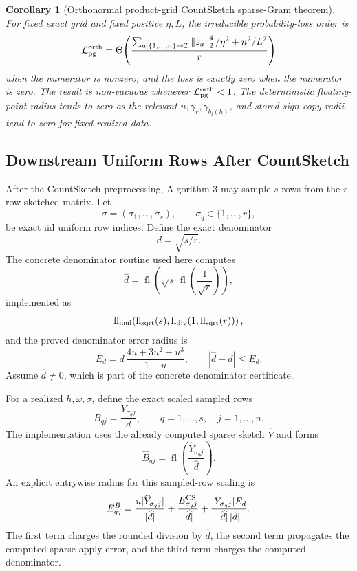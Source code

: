\documentclass[11pt]{article}
\newcommand{\Norm}[1]{\left\lVert #1\right\rVert_2}
\newcommand{\fl}{\operatorname{fl}}
\newtheorem{corollary}[theorem]{Corollary}
\theoremstyle{remark}
\begin{document}
\begin{corollary}[Orthonormal product-grid CountSketch sparse-Gram theorem]
For fixed exact grid and fixed positive \(\eta,L\), the irreducible
probability-loss order is
\[
  \mathcal L_{\rm pg}^{\rm orth}
  =
  \Theta\!\left(
    \frac{
      \sum_{a:\{1,\ldots,n\}\to\mathcal I}\Norm{z_a}^4/\eta^2
      +
      n^2/L^2
    }{r}
  \right)
\]
when the numerator is nonzero, and the loss is exactly zero when the numerator
is zero.  The result is non-vacuous whenever
\(\mathcal L_{\rm pg}^{\rm orth}<1\).  The deterministic floating-point radius
tends to zero as the relevant \(u,\gamma_r,\gamma_{b_i(h)}\), and stored-sign
copy radii tend to zero for fixed realized data.
\end{corollary}

\subsection*{Downstream Uniform Rows After CountSketch}

After the CountSketch preprocessing, Algorithm 3 may sample \(s\) rows from
the \(r\)-row sketched matrix.  Let
\[
  \sigma=(\sigma_1,\ldots,\sigma_s),
  \qquad
  \sigma_q\in\{1,\ldots,r\},
\]
be exact iid uniform row indices.  Define the exact denominator
\[
  d=\sqrt{s/r}.
\]
The concrete denominator routine used here computes
\[
  \widehat d
  =
  \fl\!\left(
    \sqrt{s}\,
    \fl\!\left(\frac{1}{\sqrt r}\right)
  \right),
\]
implemented as
\[
  \fl_{\rm mul}\!\left(
    \fl_{\rm sqrt}(s),
    \fl_{\rm div}\!\left(1,\fl_{\rm sqrt}(r)\right)
  \right),
\]
and the proved denominator error radius is
\[
  E_d
  =
  d\,\frac{4u+3u^2+u^3}{1-u},
  \qquad
  |\widehat d-d|\le E_d.
\]
Assume \(\widehat d\ne0\), which is part of the concrete denominator
certificate.

For a realized \(h,\omega,\sigma\), define the exact scaled sampled rows
\[
  B_{qj}
  =
  \frac{Y_{\sigma_q j}}{d},
  \qquad
  q=1,\ldots,s,\quad j=1,\ldots,n.
\]
The implementation uses the already computed sparse sketch \(\widehat Y\) and
forms
\[
  \widehat B_{qj}
  =
  \fl\!\left(\frac{\widehat Y_{\sigma_q j}}{\widehat d}\right).
\]
An explicit entrywise radius for this sampled-row scaling is
\[
  E^B_{qj}
  =
  \frac{u|\widehat Y_{\sigma_q j}|}{|\widehat d|}
  +
  \frac{E^{\rm CS}_{\sigma_q j}}{|\widehat d|}
  +
  \frac{|Y_{\sigma_q j}|E_d}{|\widehat d|\,|d|}.
\]
The first term charges the rounded division by \(\widehat d\), the second term
propagates the computed sparse-apply error, and the third term charges the
computed denominator.
\end{document}
